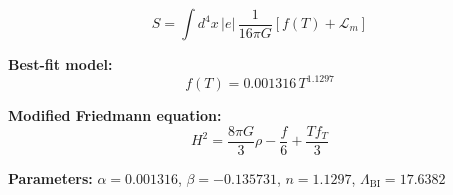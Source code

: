 
\begin{equation}
  S = \int d^4x \, |e| \, \frac{1}{16\pi G} \left[ f(T) + \mathcal{L}_m \right]
\end{equation}

\textbf{Best-fit model:}
\begin{equation}
  f(T) = 0.001316 \, T^{1.1297}
\end{equation}

\textbf{Modified Friedmann equation:}
\begin{equation}
  H^2 = \frac{8\pi G}{3} \rho - \frac{f}{6} + \frac{T f_T}{3}
\end{equation}

\textbf{Parameters:}
$\alpha = 0.001316$, \quad
$\beta = -0.135731$, \quad
$n = 1.1297$, \quad
$\Lambda_{\text{BI}} = 17.6382$